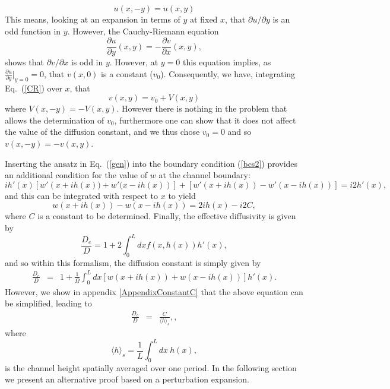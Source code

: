 \documentclass[pre,showpacs,preprintnumbers,amsmath,amssymb,superscriptaddress]{revtex4-1}
\begin{document}
{\begin{equation}
u(x,-y) = u(x,y)
\end{equation}
This means, looking at an expansion in terms of $y$ at fixed $x$, that $\partial u/\partial y$ is an odd function in $y$. However, the Cauchy-Riemann equation
\begin{equation}
\frac{\partial u}{\partial y}(x,y) = -\frac{\partial v}{\partial x}(x,y),\label{CR}
\end{equation}
shows that $\partial v/\partial x$ is odd in $y$. However, at $y=0$ this equation implies, as $\frac{\partial u}{\partial y}|_{y=0} =0$, that $v(x,0)$ is a constant ($v_0$). Consequently, we have, integrating Eq.~(\ref{CR}) over $x$, that
\begin{equation}
v(x,y) = v_0 + V(x,y)\label{vo}
\end{equation}
where $V(x,-y)=-V(x,y)$. However there is nothing in the problem that allows the  determination of  $v_0$, furthermore one can show that it does not affect the value of the diffusion constant, and we thus chose $v_0=0$ and so $v(x,-y)=-v(x,y)$. 

Inserting the ansatz in Eq.~(\ref{gen})  into the boundary condition (\ref{bcs2}) provides an additional condition for the value of $w$ at the channel boundary:
\begin{equation}
ih'(x)[w'\left(x+ih(x))+w'(x-ih(x)\right)] +[w'\left(x+ih(x)\right)-w'\left(x-ih(x)\right)] = i2{h'(x)},
\label{bcc}
\end{equation}
and this can be integrated with respect to $x$ to yield
\begin{equation}
w\left(x+ih(x)\right) - w\left(x-ih(x)\right) = 2ih(x)-i2C,\label{be}
\end{equation}
where $C$ is a constant to be determined. Finally, the effective diffusivity is given by
\begin{equation}
\frac{D_e}{D} = 1 +  2\int_0^L d{x} f({x},h({ x})) h'({x}), \label{kubo}
\end{equation}
and so within this  formalism, the diffusion constant is simply given by
\begin{eqnarray}
\frac{D_e}{D} &=& 1 +  \frac{1}{\Omega}\int_0^L d{x} [w\left(x+ih(x)\right)+w\left(x-ih(x)\right)] h'({x}).\label{kubo2}
\end{eqnarray}
However, we show in appendix \ref{AppendixConstantC} that the above equation can be simplified, leading to
\begin{eqnarray}
\frac{D_e}{D} &=& \frac{C}{\langle h \rangle_s}, \label{kubo2WithConstantC} ,
\end{eqnarray}
where 
\begin{equation}
{\langle h \rangle_s}= \frac{1}{L}\int_0^L dx \ h(x),
\end{equation}
is the channel height spatially averaged over one period.
In the following section we present an alternative proof based on a perturbation expansion.

}
\end{document}
